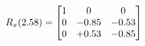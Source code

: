 \documentclass[preview]{standalone}
\begin{document}
\begin{align*}
\special{dvisvgm:raw <g id='unique000'>}R_{x}(2.58) = \begin{bmatrix}1 & 0 & 0 \\0 & -0.85 & -0.53 \\0 & +0.53 & -0.85\end{bmatrix}\special{dvisvgm:raw </g>}
\end{align*}
\end{document}
